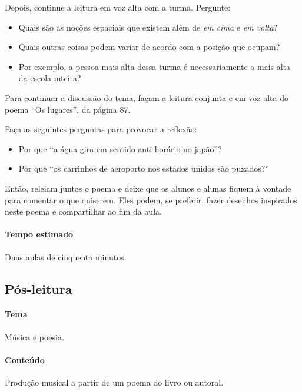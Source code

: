 \documentclass[11pt]{extarticle}
\begin{document}
Depois, continue a leitura em voz alta com a turma. 
Pergunte:

\begin{itemize}
\item Quais são as noções espaciais que existem além de \textit{em cima} e \textit{em volta}?
\item Quais outras coisas podem variar de acordo com a posição que ocupam?
\item Por exemplo, a pessoa mais alta dessa turma é necessariamente a mais alta da escola inteira?
\end{itemize}

Para continuar a discussão do tema, façam a leitura conjunta e em voz alta
do poema ``Os lugares'', da página 87.


Faça as seguintes perguntas para provocar a reflexão:

\begin{itemize}
\item Por que ``a água gira em sentido anti-horário no japão''?
\item Por que ``os carrinhos de aeroporto nos estados unidos são puxados?''
\end{itemize}

	Então, releiam juntos o poema e deixe que os alunos e alunas
	fiquem à vontade para comentar o que quiserem. 
	Eles podem, se preferir, fazer desenhos inspirados neste
	poema e compartilhar ao fim da aula. 

\paragraph{Tempo estimado} Duas aulas de cinquenta minutos.


\subsection{Pós-leitura}



\paragraph{Tema} Música e poesia.

\paragraph{Conteúdo} Produção musical a partir de um poema do livro ou autoral.
\end{document}
